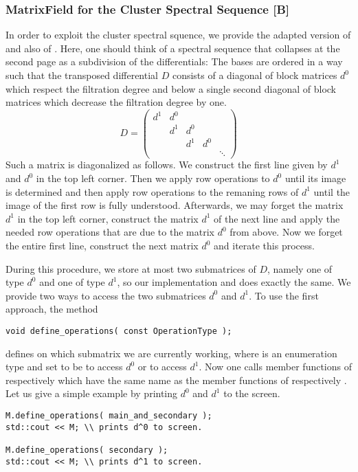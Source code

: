\subsubsection{MatrixField for the Cluster Spectral Sequence [B]}
In order to exploit the cluster spectral squence, we provide the adapted version  of  and also  of .
Here, one should think of a spectral sequence that collapses at the second page as a subdivision of the differentials:
The bases are ordered in a way such that the transposed differential $D$ consists of a diagonal of block matrices $d^0$ which respect the filtration degree and below a single second diagonal of block matrices which decrease the filtration degree by one.
\[
    D = 
        \begin{pmatrix}
            d^1 & d^0 \\
                & d^1   & d^0 \\
                &       & d^1   & d^0 \\
                &       &       &       & \ddots
        \end{pmatrix}
\]
Such a matrix is diagonalized as follows.
We construct the first line given by $d^1$ and $d^0$ in the top left corner.
Then we apply row operations to $d^0$ until its image is determined and then apply row operations to the remaning rows of $d^1$ until the image of the first row is fully understood.
Afterwards, we may forget the matrix $d^1$ in the top left corner, construct the matrix $d^1$ of the next line and apply the needed row operations that are due to the matrix $d^0$ from above.
Now we forget the entire first line, construct the next matrix $d^0$ and iterate this process.

During this procedure, we store at most two submatrices of $D$, namely one of type $d^0$ and one of type $d^1$, so our implementation  and  does exactly the same.
We provide two ways to access the two submatrices $d^0$ and $d^1$.
To use the first approach, the method
\begin{lstlisting}
void define_operations( const OperationType );
\end{lstlisting}
defines on which submatrix we are currently working, where  is an enumeration type and set to be  to access $d^0$ or  to access $d^1$.
Now one calls member functions of  respectively  which have the same name as the member functions of  respectively .
Let us give a simple example by printing $d^0$ and $d^1$ to the screen.
\begin{lstlisting}
M.define_operations( main_and_secondary );
std::cout << M; \\ prints d^0 to screen.

M.define_operations( secondary );
std::cout << M; \\ prints d^1 to screen.
\end{lstlisting}


